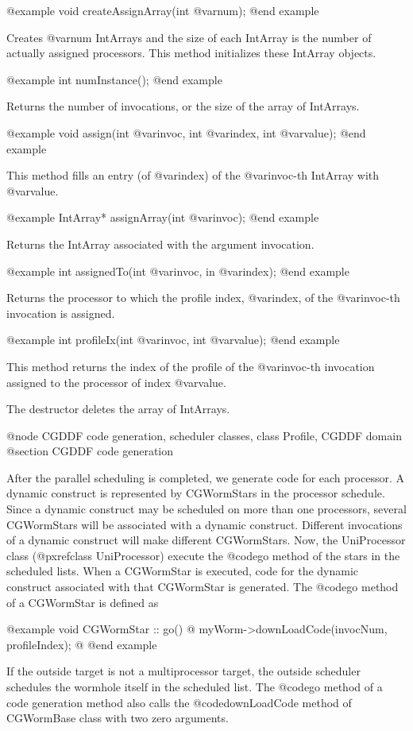 {@example
void createAssignArray(int @var{num});
@end example

Creates @var{num} IntArrays and the size of each IntArray is the
number of actually assigned processors. This method initializes these
IntArray objects.

@example
int numInstance();
@end example

Returns the number of invocations, or the size of the array of IntArrays.

@example
void assign(int @var{invoc}, int @var{index}, int @var{value});
@end example

This method fills an entry (of @var{index}) of the @var{invoc}-th
IntArray with @var{value}.

@example
IntArray* assignArray(int @var{invoc});
@end example

Returns the IntArray associated with the argument invocation.

@example
int assignedTo(int @var{invoc}, in @var{index});
@end example

Returns the processor to which the profile index, @var{index}, of the
@var{invoc}-th invocation is assigned.

@example
int profileIx(int @var{invoc}, int @var{value});
@end example

This method returns the index of the profile of the @var{invoc}-th
invocation assigned to the processor of index @var{value}.

The destructor deletes the array of IntArrays.

@node CGDDF code generation, scheduler classes, class Profile, CGDDF domain
@section CGDDF code generation

After the parallel scheduling is completed, we generate code for each
processor. A dynamic construct is represented by CGWormStars in the
processor schedule. Since a dynamic construct may be scheduled on
more than one processors, several CGWormStars will be associated with
a dynamic construct. Different invocations of a dynamic construct
will make different CGWormStars. Now, the UniProcessor class
(@pxref{class UniProcessor}) execute the @code{go} method of the stars
in the scheduled lists. When a CGWormStar is executed, code for
the dynamic construct associated with that CGWormStar is generated.
The @code{go} method of a CGWormStar is defined as

@example
void CGWormStar :: go() @{
	myWorm->downLoadCode(invocNum, profileIndex);
@}
@end example

If the outside target is not a multiprocessor target, the outside
scheduler schedules the wormhole itself in the scheduled list. The @code{go}
method of a code generation method also calls the @code{downLoadCode}
method of CGWormBase class with two zero arguments.

}
